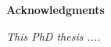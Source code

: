 
\newpage
		
\thispagestyle{empty}
		
{}
{\LARGE\bf{Acknowledgments}}
\vskip 15mm

\vskip 10mm
		
\textnormal{\textit{This PhD thesis ....}}
